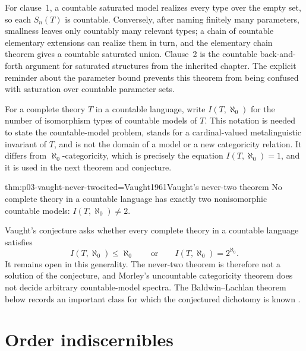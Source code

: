 For clause~1, a countable saturated model realizes every type over the empty
set, so each \(S_n(T)\) is countable.  Conversely, after naming finitely many
parameters, smallness leaves only countably many relevant types; a chain of
countable elementary extensions can realize them in turn, and the elementary
chain theorem gives a countable saturated union.  Clause~2 is the countable
back-and-forth argument for saturated structures from the inherited chapter.
The explicit reminder about the parameter bound prevents this theorem from
being confused with saturation over countable parameter sets.

For a complete theory \(T\) in a countable language, write
\(I(T,\aleph_0)\) for the number of isomorphism types of countable models of
\(T\).  This notation is needed to state the countable-model problem, stands
for a cardinal-valued metalinguistic invariant of \(T\), and is not the domain
of a model or a new categoricity relation.  It differs from
\(\aleph_0\)-categoricity, which is precisely the equation
\(I(T,\aleph_0)=1\), and it is used in the next theorem and conjecture.

\begin{hbtheorem}{thm:p03-vaught-never-two}{cited=Vaught1961}{Vaught's never-two theorem}
No complete theory in a countable language has exactly two nonisomorphic
countable models: \(I(T,\aleph_0)\ne2\).
\end{hbtheorem}

Vaught's conjecture asks whether every complete theory in a countable
language satisfies
\[
 I(T,\aleph_0)\leq\aleph_0
 \qquad\text{or}\qquad
 I(T,\aleph_0)=2^{\aleph_0}.
\]
It remains open in this generality.  The never-two theorem is therefore not a
solution of the conjecture, and Morley's uncountable categoricity theorem does
not decide arbitrary countable-model spectra.  The Baldwin--Lachlan theorem
below records an important class for which the conjectured dichotomy is known
\cite{Vaught1961,BaldwinLachlan1971,Marker2024}.

\section{Order indiscernibles}
\label{sec:p03-indiscernibles}

